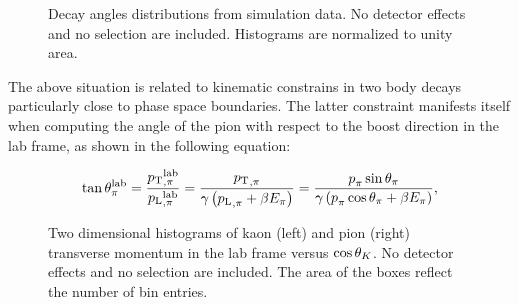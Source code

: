 \begin{figure}[t]
  \centering
  \begin{subfigure}{0.33\textwidth}
    \scalebox{0.65}{}
    \caption{}
    \label{angDistr_ctk}
  \end{subfigure}%
  \hfill%
  \begin{subfigure}{0.33\textwidth}
    \scalebox{0.65}{}
    \caption{}
    \label{angDistr_ctl}
  \end{subfigure}%
  \hfill%
  \begin{subfigure}{0.33\textwidth}
    \scalebox{0.65}{}
    \caption{}
    \label{angDistr_phi}
  \end{subfigure}
  \caption{Decay angles distributions from simulation data. No detector effects and no selection are included.
           Histograms are normalized to unity area.}
  \label{angDistr_all}
\end{figure}

The above situation is related to kinematic constrains in two body decays particularly close to phase
space boundaries. The latter constraint manifests itself when computing the angle of the pion
with respect to the boost direction in the lab frame, as shown in the following equation:

\begin{equation}
  \centering
  \tan\thetapi^\lab = \frac{\ptrans{\pi}^\lab}{\plongd{\pi}^\lab}
               = \frac{\ptrans{\pi}}{\gamma\parenthesis{\plongd{\pi} + \beta E_\pi} }
               = \frac{\ptot_{\pi} \sin\thetapi}{\gamma\parenthesis{\ptot_{\pi} \cos\thetapi + \beta E_\pi} },
  \label{pi_angle}
\end{equation}

\begin{figure}[t]
  \centering
  \begin{subfigure}{0.49\textwidth}
    \raggedright
    \scalebox{1.15}{}
    \caption{}
    \label{ctk_kaon_pt}
  \end{subfigure}%
  \hfill%
  \begin{subfigure}{0.49\textwidth}
    \raggedleft
    \scalebox{1.15}{}
    \caption{}
    \label{ctk_pion_pt}
  \end{subfigure}
  \caption{Two dimensional histograms of kaon (left) and pion (right) transverse momentum in the lab frame versus $\cos\theta_{K}$.
           No detector effects and no selection are included. The area of the boxes reflect the number of bin entries.}
  \label{ctk_hadrons_pt}
\end{figure}


